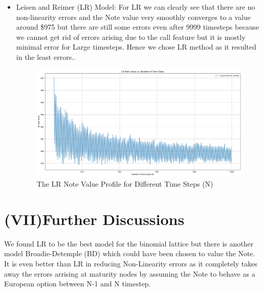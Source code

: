 \documentclass[12pt,a4paper]{article}
\begin{document}
\begin{itemize}
\item Leisen and Reimer (LR) Model:
For LR we can clearly see that there are no non-linearity errors  and the Note value very smoothly converges to a value around \$975 but there are still some errors even after 9999 timesteps because we cannot get rid of errors arising due to the call feature but it is mostly minimal error for Large timesteps. Hence we chose LR method as it resulted in the least errors..
\begin{figure}[H]
    \centering
    \includegraphics[width=1.1\textwidth, height=0.23\textheight]{Images/err_lr.png}
    \caption{The LR Note Value Profile for Different Time Steps (N)}
    \label{fig:yourlabel}
\end{figure}
\end{itemize}

\section*{(VII)Further Discussions}
We found LR to be the best model for the binomial lattice but there is another model Broadie-Detemple (BD) which could have been chosen to value the Note. It is even better than LR in reducing Non-Linearity errors as it completely takes away the errors arrising at maturity nodes by assuming the Note to behave as a European option between N-1 and N timestep.
\end{document}
